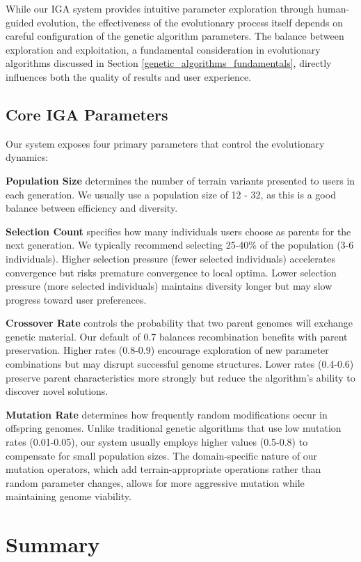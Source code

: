 While our IGA system provides intuitive parameter exploration through human-guided evolution, the effectiveness of the evolutionary process itself depends on careful configuration of the genetic algorithm parameters. The balance between exploration and exploitation, a fundamental consideration in evolutionary algorithms discussed in Section \ref{genetic_algorithms_fundamentals}, directly influences both the quality of results and user experience.

\subsection{Core IGA Parameters}

Our system exposes four primary parameters that control the evolutionary dynamics:

\textbf{Population Size} determines the number of terrain variants presented to users in each generation. We usually use a population size of 12 - 32, as this is a good balance between efficiency and diversity. 

\textbf{Selection Count} specifies how many individuals users choose as parents for the next generation. We typically recommend selecting 25-40\% of the population (3-6 individuals). Higher selection pressure (fewer selected individuals) accelerates convergence but risks premature convergence to local optima. Lower selection pressure (more selected individuals) maintains diversity longer but may slow progress toward user preferences.

\textbf{Crossover Rate} controls the probability that two parent genomes will exchange genetic material. Our default of 0.7 balances recombination benefits with parent preservation. Higher rates (0.8-0.9) encourage exploration of new parameter combinations but may disrupt successful genome structures. Lower rates (0.4-0.6) preserve parent characteristics more strongly but reduce the algorithm's ability to discover novel solutions.

\textbf{Mutation Rate} determines how frequently random modifications occur in offspring genomes. Unlike traditional genetic algorithms that use low mutation rates (0.01-0.05), our system usually employs higher values (0.5-0.8) to compensate for small population sizes. The domain-specific nature of our mutation operators, which add terrain-appropriate operations rather than random parameter changes, allows for more aggressive mutation while maintaining genome viability.

\section{Summary}

